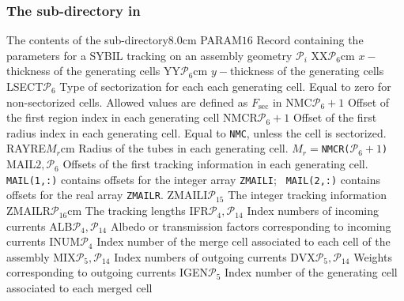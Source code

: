 \clearpage

\subsubsection{The  sub-directory in }\label{sect:eurydicetrackingdir}

\vskip -0.9cm

\begin{DescriptionEnregistrement}{The contents of the 
 sub-directory}{8.0cm}
\IntEnr
  {PARAM}{$16$}
{Record containing the parameters for a SYBIL tracking on an assembly geometry
   $\mathcal{P}_{i}$}
\RealEnr
  {XX}{$\mathcal{P}_{6}$}{cm}
  {$x-$thickness of the generating cells}
\RealEnr
  {YY}{$\mathcal{P}_{6}$}{cm}
  {$y-$thickness of the generating cells}
\IntEnr
  {LSECT}{$\mathcal{P}_{6}$}
  {Type of sectorization for each each generating cell. Equal to zero for
   non-sectorized cells. Allowed values are defined as $F_{\mathrm{sec}}$ in }
\IntEnr
  {NMC}{$\mathcal{P}_{6}+1$}
  {Offset of the first region index in each generating cell}
\IntEnr
  {NMCR}{$\mathcal{P}_{6}+1$}
  {Offset of the first radius index in each generating cell. Equal to
   {\tt NMC}, unless the cell is sectorized.}
\RealEnr
  {RAYRE}{$M_r$}{cm}
  {Radius of the tubes in each generating cell. $M_r=${\tt NMCR(}$\mathcal{P}_{6}+1${\tt )}}
\IntEnr
  {MAIL}{$2,\mathcal{P}_{6}$}
  {Offsets of the first tracking information in each generating cell. {\tt
   MAIL(1,:)} contains offsets for the integer array {\tt ZMAILI}; {\tt
   MAIL(2,:)} contains offsets for the real array {\tt ZMAILR}.}
\IntEnr
  {ZMAILI}{$\mathcal{P}_{15}$}
  {The integer tracking information}
\RealEnr
  {ZMAILR}{$\mathcal{P}_{16}$}{cm}
  {The tracking lengths}
\IntEnr
  {IFR}{$\mathcal{P}_{4},\mathcal{P}_{14}$}
  {Index numbers of incoming currents}
\RealEnr
  {ALB}{$\mathcal{P}_{4},\mathcal{P}_{14}$}{}
  {Albedo or transmission factors corresponding to incoming currents}
\IntEnr
  {INUM}{$\mathcal{P}_{4}$}
  {Index  number of the merge cell associated to each cell of the assembly}
\IntEnr
  {MIX}{$\mathcal{P}_{5},\mathcal{P}_{14}$}
  {Index  numbers of outgoing currents}
\RealEnr
  {DVX}{$\mathcal{P}_{5},\mathcal{P}_{14}$}{}
  {Weights corresponding to outgoing currents}
\IntEnr
  {IGEN}{$\mathcal{P}_{5}$}
  {Index number of the generating cell associated to each merged cell}
\end{DescriptionEnregistrement}


